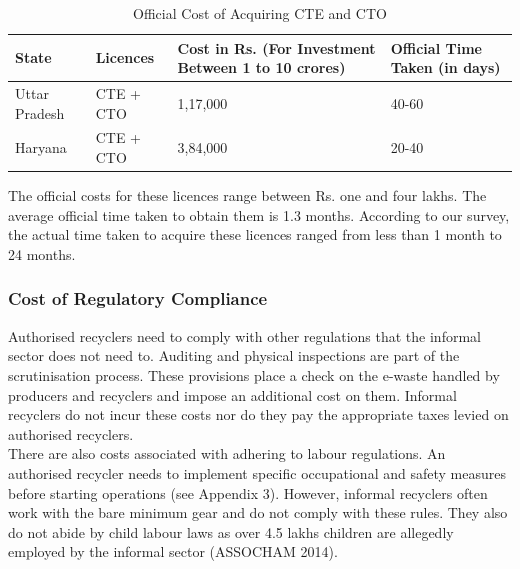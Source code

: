 \documentclass[a4paper, 12pt]{article}
\begin{document}
        \begin{table}[htbp]
          \centering
          \caption{Official Cost of Acquiring CTE and CTO}
            \begin{tabular}{llll}
            \multicolumn{1}{p{5em}}{State} & \multicolumn{1}{p{5em}}{Licences} & \multicolumn{1}{p{12.585em}}{Cost in Rs. (For Investment Between 1 to 10 crores)} & \multicolumn{1}{p{7.165em}}{Official Time Taken (in days)} \\
            \midrule
            Uttar Pradesh  & CTE + CTO  & 1,17,000 & 40-60 \\
            Haryana & CTE + CTO  & 3,84,000 & 20-40 \\
            \end{tabular}%
          \label{tab:addlabel}%
        \end{table}%
                    
                    The official costs for these licences range between Rs. one and four lakhs. The average official time taken to obtain them is 1.3 months. According to our survey, the actual time taken to acquire these licences ranged from less than 1 month to 24 months.\\
                    
                    \subsubsection{Cost of Regulatory Compliance}
                    
                    Authorised recyclers need to comply with other regulations that the informal sector does not need to. Auditing and physical inspections are part of the scrutinisation process. These provisions place a check on the e-waste handled by producers and recyclers and impose an additional cost on them. Informal recyclers do not incur these costs nor do they pay the appropriate taxes levied on authorised recyclers. \\
                    
                    There are also costs associated with adhering to labour regulations. An authorised recycler needs to implement specific occupational and safety measures before starting operations (see Appendix 3). However, informal recyclers often work with the bare minimum gear and do not comply with these rules. They also do not abide by child labour laws as over 4.5 lakhs children are allegedly employed by the informal sector (ASSOCHAM 2014).\\
                    
\end{document}
